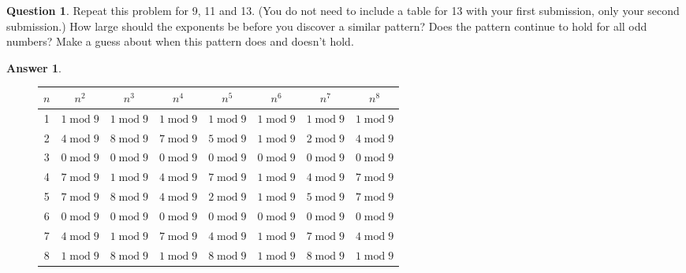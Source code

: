 \documentclass[article, 12pt]{article}
\theoremstyle{definition}
\newtheorem{question}{Question}
\newtheorem{answer}{Answer}
\newcommand{\Mod}[1]{\;\mathrm{mod}\; #1} %
\begin{document}
    \begin{question}
        Repeat this problem for 9, 11 and 13. (You do not need to include a table for 13 with your first submission, only your second submission.) How large should the exponents be before you discover a similar pattern? Does the pattern continue to hold for all odd numbers? Make a guess about when this pattern does and doesn't hold.
    \end{question}
    \begin{answer} \
        \begin{figure}[H]
            \centering

            \begin{tabular}{|c|c|c|c|c|c|c|c|}
                \hline
                $n$ & $n^2$ & $n^3$ & $n^4$ & $n^5$ & $n^6$ & $n^7$ & $n^8$  \\
                \hline
                1 & $1 \Mod{9}$ & $1 \Mod{9}$ & $1 \Mod{9}$ & $1 \Mod{9}$ & $1 \Mod{9}$ & $1 \Mod{9}$ & $1 \Mod{9}$ \\  
                2 & $4 \Mod{9}$ & $8 \Mod{9}$ & $7 \Mod{9}$ & $5 \Mod{9}$ & $1 \Mod{9}$ & $2 \Mod{9}$ & $4 \Mod{9}$ \\
                3 & $0 \Mod{9}$ & $0 \Mod{9}$ & $0 \Mod{9}$ & $0 \Mod{9}$ & $0 \Mod{9}$ & $0 \Mod{9}$ & $0 \Mod{9}$ \\
                4 & $7 \Mod{9}$ & $1 \Mod{9}$ & $4 \Mod{9}$ & $7 \Mod{9}$ & $1 \Mod{9}$ & $4 \Mod{9}$ & $7 \Mod{9}$ \\ 
                5 & $7 \Mod{9}$ & $8 \Mod{9}$ & $4 \Mod{9}$ & $2 \Mod{9}$ & $1 \Mod{9}$ & $5 \Mod{9}$ & $7 \Mod{9}$ \\
                6 & $0 \Mod{9}$ & $0 \Mod{9}$ & $0 \Mod{9}$ & $0 \Mod{9}$ & $0 \Mod{9}$ & $0 \Mod{9}$ & $0 \Mod{9}$ \\
                7 & $4 \Mod{9}$ & $1 \Mod{9}$ & $7 \Mod{9}$ & $4 \Mod{9}$ & $1 \Mod{9}$ & $7 \Mod{9}$ & $4 \Mod{9}$ \\ 
                8 & $1 \Mod{9}$ & $8 \Mod{9}$ & $1 \Mod{9}$ & $8 \Mod{9}$ & $1 \Mod{9}$ & $8 \Mod{9}$ & $1 \Mod{9}$ \\
                \hline
            \end{tabular}
        \end{figure}
        \begin{figure}[H]
            \centering
\end{figure}
\end{answer}
\end{document}
